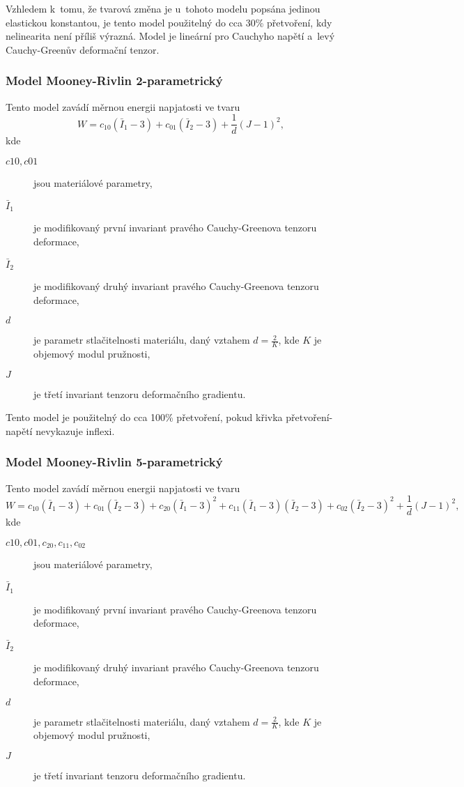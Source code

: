 Vzhledem k~tomu, že tvarová změna je u~tohoto modelu popsána jedinou elastickou konstantou, je tento model použitelný do cca 30\% přetvoření, kdy nelinearita není příliš výrazná. Model je lineární pro Cauchyho napětí a~levý Cauchy-Greenův deformační tenzor.

\subsubsection{Model Mooney-Rivlin 2-parametrický}
Tento model zavádí měrnou energii napjatosti ve tvaru
\begin{equation}
	W = c_{10} \left(\bar{I}_1 - 3\right) + c_{01} \left(\bar{I}_2 - 3\right) + \frac{1}{d} \left(J - 1\right)^2,
\end{equation}
kde
\begin{description}
	\item[$c10, c01$] jsou materiálové parametry,
	\item[$\bar{I}_1$] je modifikovaný první invariant pravého Cauchy-Greenova tenzoru deformace,
	\item[$\bar{I}_2$] je modifikovaný druhý invariant pravého Cauchy-Greenova tenzoru deformace,
	\item[$d$] je parametr stlačitelnosti materiálu, daný vztahem $d = \frac{2}{K}$, kde $K$ je objemový modul pružnosti,
	\item[$J$] je třetí invariant tenzoru deformačního gradientu.
\end{description}

Tento model je použitelný do cca 100\% přetvoření, pokud křivka přetvoření-napětí nevykazuje inflexi.

\subsubsection{Model Mooney-Rivlin 5-parametrický}
Tento model zavádí měrnou energii napjatosti ve tvaru
\begin{equation}
	W
	= c_{10} \left(\bar{I}_1 - 3\right)
	+ c_{01} \left(\bar{I}_2 - 3\right)
	+ c_{20} \left(\bar{I}_1 - 3\right)^2
	+ c_{11} \left(\bar{I}_1 - 3\right) \left(\bar{I}_2 - 3\right)
	+ c_{02} \left(\bar{I}_2 - 3\right)^2
	+ \frac{1}{d} \left(J - 1\right)^2,
\end{equation}
kde
\begin{description}
	\item[$c10, c01, c_{20}, c_{11}, c_{02}$] jsou materiálové parametry,
	\item[$\bar{I}_1$] je modifikovaný první invariant pravého Cauchy-Greenova tenzoru deformace,
	\item[$\bar{I}_2$] je modifikovaný druhý invariant pravého Cauchy-Greenova tenzoru deformace,
	\item[$d$] je parametr stlačitelnosti materiálu, daný vztahem $d = \frac{2}{K}$, kde $K$ je objemový modul pružnosti,
	\item[$J$] je třetí invariant tenzoru deformačního gradientu.
\end{description}

